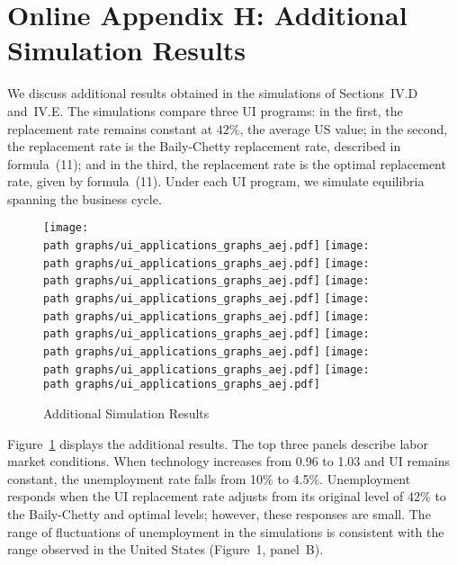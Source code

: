 \documentclass[letterpaper,12pt,leqno]{article}
\def\path{../}
\begin{document}
\section{Online Appendix H: Additional Simulation Results}\label{app:simulation}

We discuss additional results obtained in the simulations of Sections~IV.D and~IV.E. The simulations compare three UI programs: in the first, the replacement rate remains constant at $42\%$, the average US value; in the second, the replacement rate is the Baily-Chetty replacement rate, described in formula~(11); and in the third, the replacement rate is the optimal replacement rate, given by formula~(11). Under each UI program, we simulate equilibria spanning the business cycle.  

\begin{figure}[p] \centering
\texttt{[image: \\path graphs/ui\_applications\_graphs\_aej.pdf]}
\texttt{[image: \\path graphs/ui\_applications\_graphs\_aej.pdf]}
\texttt{[image: \\path graphs/ui\_applications\_graphs\_aej.pdf]}
\texttt{[image: \\path graphs/ui\_applications\_graphs\_aej.pdf]}
\texttt{[image: \\path graphs/ui\_applications\_graphs\_aej.pdf]}
\texttt{[image: \\path graphs/ui\_applications\_graphs\_aej.pdf]}
\texttt{[image: \\path graphs/ui\_applications\_graphs\_aej.pdf]}
\texttt{[image: \\path graphs/ui\_applications\_graphs\_aej.pdf]}
\texttt{[image: \\path graphs/ui\_applications\_graphs\_aej.pdf]}
\caption{Additional Simulation Results}
\label{fig:additional}\end{figure}

Figure~\ref{fig:additional} displays the additional results. The top three panels describe labor market conditions. When technology increases from 0.96 to 1.03 and UI remains constant, the unemployment rate falls from 10\% to 4.5\%. Unemployment responds when the UI replacement rate adjusts from its original level of 42\% to the Baily-Chetty and optimal levels; however, these responses are small. The range of fluctuations of unemployment in the simulations is consistent with the range observed in the United States (Figure~1, panel~B). 
\end{document}
